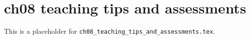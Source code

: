 \chapter{ch08 teaching tips and assessments}
\label{ch08_teaching_tips_and_assessments}

This is a placeholder for \texttt{ch08_teaching_tips_and_assessments.tex}.


